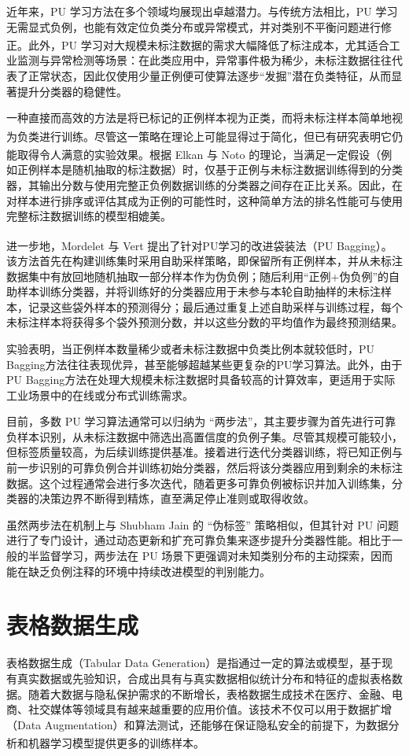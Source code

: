 近年来，PU 学习方法在多个领域均展现出卓越潜力。与传统方法相比，PU 学习无需显式负例，也能有效定位负类分布或异常模式，并对类别不平衡问题进行修正\textsuperscript{\cite{elkan2008learning}}。此外，PU 学习对大规模未标注数据的需求大幅降低了标注成本，尤其适合工业监测与异常检测等场景：在此类应用中，异常事件极为稀少，未标注数据往往代表了正常状态，因此仅使用少量正例便可使算法逐步“发掘”潜在负类特征，从而显著提升分类器的稳健性。

一种直接而高效的方法是将已标记的正例样本视为正类，而将未标注样本简单地视为负类进行训练\textsuperscript{\cite{elkan2008learning}}。尽管这一策略在理论上可能显得过于简化，但已有研究表明它仍能取得令人满意的实验效果。根据 Elkan 与 Noto\textsuperscript{\cite{elkan2008learning}} 的理论，当满足一定假设（例如正例样本是随机抽取的标注数据）时，仅基于正例与未标注数据训练得到的分类器，其输出分数与使用完整正负例数据训练的分类器之间存在正比关系。因此，在对样本进行排序或评估其成为正例的可能性时，这种简单方法的排名性能可与使用完整标注数据训练的模型相媲美。

进一步地，Mordelet 与 Vert\textsuperscript{\cite{mordelet2013bagging}} 提出了针对PU学习的改进袋装法（PU Bagging）。该方法首先在构建训练集时采用自助采样策略，即保留所有正例样本，并从未标注数据集中有放回地随机抽取一部分样本作为伪负例；随后利用“正例+伪负例”的自助样本训练分类器，并将训练好的分类器应用于未参与本轮自助抽样的未标注样本，记录这些袋外样本的预测得分；最后通过重复上述自助采样与训练过程，每个未标注样本将获得多个袋外预测分数，并以这些分数的平均值作为最终预测结果。

实验表明，当正例样本数量稀少或者未标注数据中负类比例本就较低时，PU Bagging方法往往表现优异，甚至能够超越某些更复杂的PU学习算法。此外，由于PU Bagging方法在处理大规模未标注数据时具备较高的计算效率，更适用于实际工业场景中的在线或分布式训练需求。

目前，多数 PU 学习算法通常可以归纳为 “两步法”，其主要步骤为首先进行可靠负样本识别，从未标注数据中筛选出高置信度的负例子集。尽管其规模可能较小，但标签质量较高，为后续训练提供基准。接着进行迭代分类器训练，将已知正例与前一步识别的可靠负例合并训练初始分类器，然后将该分类器应用到剩余的未标注数据。这个过程通常会进行多次迭代，随着更多可靠负例被标识并加入训练集，分类器的决策边界不断得到精炼，直至满足停止准则或取得收敛。

虽然两步法在机制上与 Shubham Jain 的 “伪标签” 策略相似，但其针对 PU 问题进行了专门设计，通过动态更新和扩充可靠负集来逐步提升分类器性能。相比于一般的半监督学习，两步法在 PU 场景下更强调对未知类别分布的主动探索，因而能在缺乏负例注释的环境中持续改进模型的判别能力。
\section{表格数据生成}
表格数据生成（Tabular Data Generation）是指通过一定的算法或模型，基于现有真实数据或先验知识，合成出具有与真实数据相似统计分布和特征的虚拟表格数据。随着大数据与隐私保护需求的不断增长，表格数据生成技术在医疗、金融、电商、社交媒体等领域具有越来越重要的应用价值。该技术不仅可以用于数据扩增（Data Augmentation）和算法测试，还能够在保证隐私安全的前提下，为数据分析和机器学习模型提供更多的训练样本\textsuperscript{\cite{li2021survey}}。

